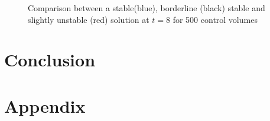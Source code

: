 \documentclass[paper=a4, fontsize=11pt, abstract=on]{scrartcl}
\numberwithin{equation}{section}		%
\numberwithin{figure}{section}			%
\numberwithin{table}{section}				%
\begin{document}
\begin{figure}[H]
\begin{subfigure}[h]{\textwidth}
        \end{subfigure}
        \caption{Comparison between a stable(blue), borderline (black) stable and slightly unstable (red) solution at $t=8$ for 500 control volumes}
        \label{q34}
\end{figure}


\section{Conclusion}







\appendix
\section{Appendix} \label{App:Appendix}
\end{document}
